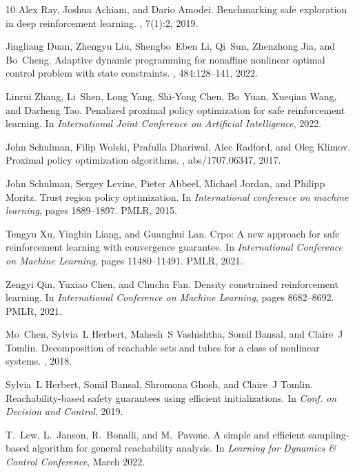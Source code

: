 \documentclass{article}
\theoremstyle{definition}
\begin{document}
\begin{thebibliography}{10}
Alex Ray, Joshua Achiam, and Dario Amodei.
\newblock Benchmarking safe exploration in deep reinforcement learning.
, 7(1):2, 2019.

Jingliang Duan, Zhengyu Liu, Shengbo~Eben Li, Qi~Sun, Zhenzhong Jia, and Bo~Cheng.
\newblock Adaptive dynamic programming for nonaffine nonlinear optimal control problem with state constraints.
, 484:128--141, 2022.

Linrui Zhang, Li~Shen, Long Yang, Shi-Yong Chen, Bo~Yuan, Xueqian Wang, and Dacheng Tao.
\newblock Penalized proximal policy optimization for safe reinforcement learning.
\newblock In {\em International Joint Conference on Artificial Intelligence}, 2022.

John Schulman, Filip Wolski, Prafulla Dhariwal, Alec Radford, and Oleg Klimov.
\newblock Proximal policy optimization algorithms.
, abs/1707.06347, 2017.

John Schulman, Sergey Levine, Pieter Abbeel, Michael Jordan, and Philipp Moritz.
\newblock Trust region policy optimization.
\newblock In {\em International conference on machine learning}, pages 1889--1897. PMLR, 2015.

Tengyu Xu, Yingbin Liang, and Guanghui Lan.
\newblock Crpo: A new approach for safe reinforcement learning with convergence guarantee.
\newblock In {\em International Conference on Machine Learning}, pages 11480--11491. PMLR, 2021.

Zengyi Qin, Yuxiao Chen, and Chuchu Fan.
\newblock Density constrained reinforcement learning.
\newblock In {\em International Conference on Machine Learning}, pages 8682--8692. PMLR, 2021.

Mo~Chen, Sylvia~L Herbert, Mahesh~S Vashishtha, Somil Bansal, and Claire~J Tomlin.
\newblock Decomposition of reachable sets and tubes for a class of nonlinear systems.
, 2018.

Sylvia~L Herbert, Somil Bansal, Shromona Ghosh, and Claire~J Tomlin.
\newblock Reachability-based safety guarantees using efficient initializations.
\newblock In {\em Conf. on Decision and Control}, 2019.

T.~Lew, L.~Janson, R.~Bonalli, and M.~Pavone.
\newblock A simple and efficient sampling-based algorithm for general reachability analysis.
\newblock In {\em {Learning for Dynamics \& Control Conference}}, March 2022.


\end{thebibliography}
\end{document}
